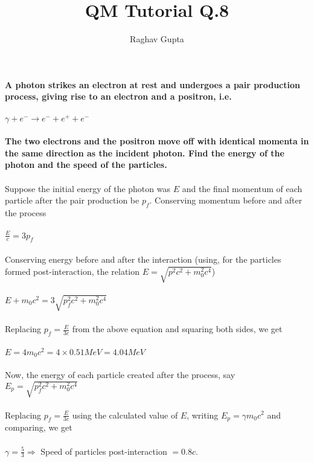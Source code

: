 \documentclass{article}
\begin{document}
\title {QM Tutorial Q.8}
\author{Raghav Gupta}
\maketitle
\textbf{A photon strikes an electron at rest and undergoes a pair production process, giving rise to an electron and a positron, i.e.\\\\\(\gamma + e^- \rightarrow e^- + e^+ + e^-\)\\\\The two electrons and the positron move off with identical momenta in the same direction as the incident photon. Find the energy of the photon and the speed of the particles.}\\\\Suppose the initial energy of the photon was \(E\) and the final momentum of each particle after the pair production be \(p_f\). Conserving momentum before and after the process\\\\\(\frac{E}{c} = 3p_f\)\\\\Conserving energy before and after the interaction (using, for the particles formed post-interaction, the relation \(E = \sqrt{p^2c^2 + m_0^2c^4}\))\\\\\(E + m_0c^2 = 3\sqrt{p_f^2c^2 + m_0^2c^4}\)\\\\Replacing \(p_f = \frac{E}{3c}\) from the above equation and squaring both sides, we get\\\\\(E = 4m_0c^2 = 4\times 0.51MeV = 4.04MeV\)\\\\Now, the energy of each particle created after the process, say \(E_p= \sqrt{p_f^2c^2 + m_0^2c^4}\)\\\\Replacing \(p_f = \frac{E}{3c}\) using the calculated value of \(E\), writing \(E_p = \gamma m_0c^2\) and comparing, we get\\\\\(\gamma = \frac{5}{3} \Rightarrow\) Speed of particles post-interaction \(= 0.8c\).
\end{document}
